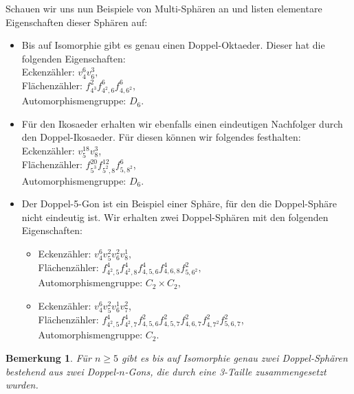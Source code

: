 \documentclass[12pt,titlepage,twoside,cleardoublepage]{article}
\theoremstyle{nummermitklammern}
\newtheorem{bemerkung}[temp]{Bemerkung}
\newtheorem{bemerkung}[zahl]{Bemerkung}
\numberwithin{equation}{section}
\begin{document}
Schauen wir uns nun Beispiele von Multi-Sphären an und listen elementare Eigenschaften dieser Sphären auf:
\begin{itemize}
\item Bis auf Isomorphie gibt es genau einen Doppel-Oktaeder. Dieser hat die folgenden Eigenschaften:\\
Eckenzähler: $v_4^6v_6^3,$\\
Flächenzähler: $f_{4^3}^2f_{4^2,6}^6f_{4,6^2}^6,$\\
Automorphismengruppe: $D_6.$\\ 
\item Für den Ikosaeder erhalten wir ebenfalls einen eindeutigen Nachfolger durch den Doppel-Ikosaeder. Für diesen können wir folgendes festhalten:\\
Eckenzähler: $v_5^{18}v_8^3$,\\
Flächenzähler: $f_{5^3}^{20}f_{5^2,8}^{12}f^6_{5,8^2}$,\\
Automorphismengruppe: $D_6.$\\
\item 
Der Doppel-5-Gon ist ein Beispiel einer Sphäre, für den die Doppel-Sphäre nicht eindeutig ist. Wir erhalten zwei Doppel-Sphären mit den folgenden Eigenschaften:\\
\begin{itemize}
\item Eckenzähler: $v_4^6v_5^2v_6^2v_8^1,$\\
Flächenzähler: $f_{4^2,5}^4f^4_{4^2,8}f^4_{4,5,6}f^4_{4,6,8}f^2_{5,6^2},$\\
Automorphismengruppe: $C_2\times C_2,$\\
\item 
Eckenzähler: $v_4^6v_5^2v_6^1v_7^2$,\\
Flächenzähler: $f_{4^2,5}^4f^4_{4^2,7}f^2_{4,5,6}f^2_{4,5,7}f^2_{4,6,7}f^2_{4,7^2}f^2_{5,6,7}$,\\
Automorphismengruppe: $C_2$.\\
\end{itemize}
\end{itemize}
\begin{bemerkung}
Für $n\geq 5$ gibt es bis auf Isomorphie genau zwei Doppel-Sphären bestehend aus zwei Doppel-$n$-Gons, die durch eine 3-Taille zusammengesetzt wurden.
\end{bemerkung}
\end{document}

